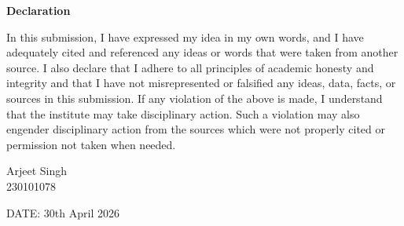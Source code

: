 \begin{flushleft}
    {\Huge\bfseries Declaration}
\end{flushleft}

\vspace{1.5cm}

In this submission, I have expressed my idea in my own words, and I have adequately cited and
referenced any ideas or words that were taken from another source. I also declare that I adhere
to all principles of academic honesty and integrity and that I have not misrepresented or falsified
any ideas, data, facts, or sources in this submission. If any violation of the above is made, I
understand that the institute may take disciplinary action. Such a violation may also engender
disciplinary action from the sources which were not properly cited or permission not taken when
needed.

\vspace{3cm}

\begin{flushright}
    Arjeet Singh\\
    230101078
\end{flushright}

\vspace{0.5cm}
\noindent DATE: 30th April 2026

